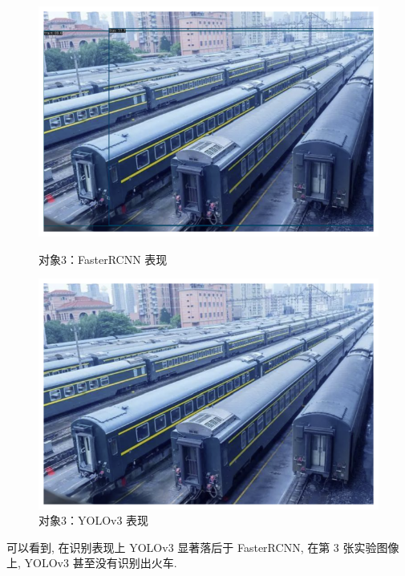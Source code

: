 \documentclass[notitlepage,cs4size,punct,oneside]{ctexrep}
\numberwithin{equation}{chapter}
\theoremstyle{mystyle}
\begin{document}
\begin{figure}[!htpb]
    \centering
    \begin{minipage}[t]{0.49\textwidth}
    \includegraphics[width=\linewidth]{cnntest3.png}
    \caption{对象3：FasterRCNN 表现}
    \label{mAPfrcnn}
    \end{minipage}
    \begin{minipage}[t]{0.49\textwidth}
    \includegraphics[width=\linewidth]{yolotest3.png}
    \caption{对象3：YOLOv3 表现}
    \label{frcnn_loss}
    \end{minipage}
\end{figure}

可以看到, 在识别表现上 YOLOv3 显著落后于 FasterRCNN, 在第 3 张实验图像上, YOLOv3 甚至没有识别出火车.
\end{document}
